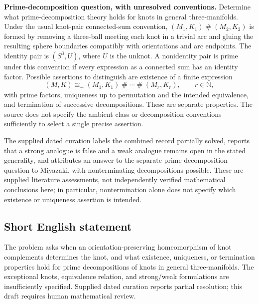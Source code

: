 \documentclass[11pt]{article}
\newcommand{\N}{\mathbb{N}}
\begin{document}
\textbf{Prime-decomposition question, with unresolved conventions.}
Determine what prime-decomposition theory holds for knots in general three-manifolds. Under the usual knot-pair connected-sum convention, \((M_1,K_1)\mathbin{\#}(M_2,K_2)\) is formed by removing a three-ball meeting each knot in a trivial arc and gluing the resulting sphere boundaries compatibly with orientations and arc endpoints. The identity pair is \((S^3,U)\), where \(U\) is the unknot. A nonidentity pair is prime under this convention if every expression as a connected sum has an identity factor. Possible assertions to distinguish are existence of a finite expression
\[
(M,K)\cong_{+}(M_1,K_1)\mathbin{\#}\cdots\mathbin{\#}(M_r,K_r),
\qquad r\in\N,
\]
with prime factors, uniqueness up to permutation and the intended equivalence, and termination of successive decompositions. These are separate properties. The source does not specify the ambient class or decomposition conventions sufficiently to select a single precise assertion.

The supplied dated curation labels the combined record partially solved, reports that a strong analogue is false and a weak analogue remains open in the stated generality, and attributes an answer to the separate prime-decomposition question to Miyazaki, with nonterminating decompositions possible. These are supplied literature assessments, not independently verified mathematical conclusions here; in particular, nontermination alone does not specify which existence or uniqueness assertion is intended.
\subsection{Short English statement}
The problem asks when an orientation-preserving homeomorphism of knot complements determines the knot, and what existence, uniqueness, or termination properties hold for prime decompositions of knots in general three-manifolds. The exceptional knots, equivalence relation, and strong/weak formulations are insufficiently specified. Supplied dated curation reports partial resolution; this draft requires human mathematical review.
\end{document}
